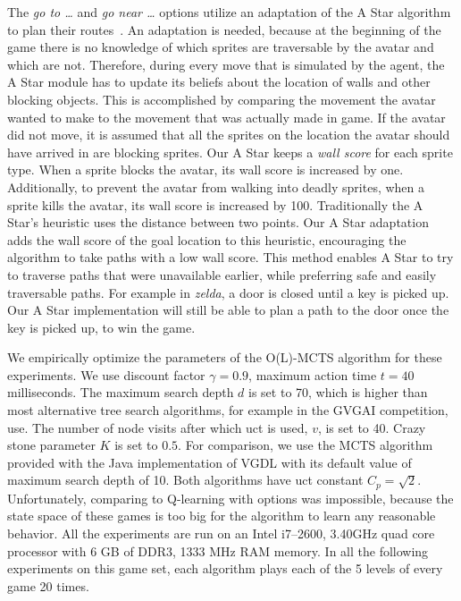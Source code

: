 The \emph{go to \ldots} and \emph{go near \ldots} options utilize an adaptation
of the A Star algorithm to plan their routes~\cite{hart1968formal}. An
adaptation is needed, because at the beginning of the game there is no knowledge
of which sprites are traversable by the avatar and which are not. Therefore,
during every move that is simulated by the agent, the A Star module has to
update its beliefs about the location of walls and other blocking objects. This
is accomplished by comparing the movement the avatar wanted to make to the
movement that was actually made in game. If the avatar did not move, it is
assumed that all the sprites on the location the avatar should have arrived in
are blocking sprites. Our A Star keeps a \emph{wall score} for each sprite type.
When a sprite blocks the avatar, its wall score is increased by one.
Additionally, to prevent the avatar from walking into deadly sprites, when a
sprite kills the avatar, its wall score is increased by 100.  Traditionally the
A Star's heuristic uses the distance between two points. Our A Star adaptation
adds the wall score of the goal location to this heuristic, encouraging the
algorithm to take paths with a low wall score. This method enables A Star to
try to traverse paths that were unavailable earlier, while preferring safe and
easily traversable paths. For example in \textit{zelda}, a door is closed until
a key is picked up. Our A Star implementation will still be able to plan a path
to the door once the key is picked up, to win the game.

We empirically optimize the parameters of the O(L)-MCTS algorithm
for these experiments. We use discount factor $\gamma = 0.9$, maximum action
time $t = 40$ milliseconds. The maximum search depth $d$ is set to 70, which is
higher than most alternative tree search algorithms, for example in the GVGAI
competition, use. The number of node visits after which \textsf{uct} is used,
$v$, is set to 40. Crazy stone parameter $K$ is set to $0.5$.  For comparison,
we use the MCTS algorithm provided with the Java implementation of VGDL with its
default value of maximum search depth of 10. Both algorithms have \textsf{uct}
constant $C_p = \sqrt{2}$. Unfortunately, comparing to Q-learning with options
was impossible, because the state space of these games is too big for the
algorithm to learn any reasonable behavior. All the experiments are run on an
Intel i7--2600, 3.40GHz quad core processor with 6 GB of DDR3, 1333 MHz RAM
memory. In all the following experiments on this game set, each algorithm plays
each of the 5 levels of every game 20 times.

